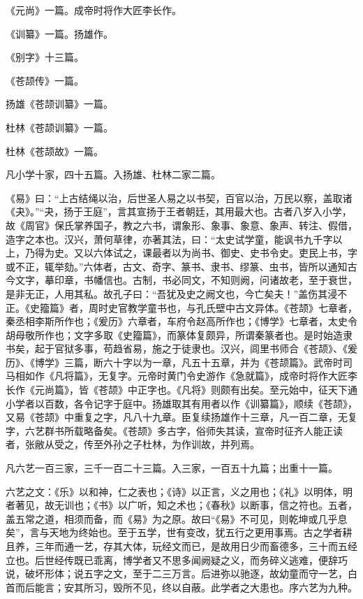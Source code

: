 \documentclass[]{article}
\begin{document}
《元尚》一篇。成帝时将作大匠李长作。

《训纂》一篇。扬雄作。

《别字》十三篇。

《苍颉传》一篇。

扬雄《苍颉训纂》一篇。

杜林《苍颉训纂》一篇。

杜林《苍颉故》一篇。

凡小学十家，四十五篇。入扬雄、杜林二家二篇。

《易》曰：``上古结绳以治，后世圣人易之以书契，百官以治，万民以察，盖取诸《夬》。''``夬，扬于王庭''，言其宣扬于王者朝廷，其用最大也。古者八岁入小学，故《周官》保氏掌养国子，教之六书，谓象形、象事、象意、象声、转注、假借，造字之本也。汉兴，萧何草律，亦著其法，曰：``太史试学童，能讽书九千字以上，乃得为史。又以六体试之，课最者以为尚书、御史、史书令史。吏民上书，字或不正，辄举劾。''六体者，古文、奇字、篆书、隶书、缪篆、虫书，皆所以通知古今文字，摹印章，书幡信也。古制，书必同文，不知则阙，问诸故老，至于衰世，是非无正，人用其私。故孔子曰：``吾犹及史之阙文也，今亡矣夫！''盖伤其浸不正。《史籀篇》者，周时史官教学童书也，与孔氏壁中古文异体。《苍颉》七章者，秦丞相李斯所作也；《爰历》六章者，车府令赵高所作也；《博学》七章者，太史令胡母敬所作也；文字多取《史籀篇》，而篆体复颇异，所谓秦篆者也。是时始造隶书矣，起于官狱多事，苟趋省易，施之于徒隶也。汉兴，闾里书师合《苍颉》、《爰历》、《博学》三篇，断六十字以为一章，凡五十五章，并为《苍颉篇》。武帝时司马相如作《凡将篇》，无复字。元帝时黄门令史游作《急就篇》，成帝时将作大匠李长作《元尚篇》，皆《苍颉》中正字也。《凡将》则颇有出矣。至元始中，征天下通小学者以百数，各令记字于庭中。扬雄取其有用者以作《训纂篇》，顺续《苍颉》，又易《苍颉》中重复之字，凡八十九章。臣复续扬雄作十三章，凡一百二章，无复字，六艺群书所载略备矣。《苍颉》多古字，俗师失其读，宣帝时征齐人能正读者，张敝从受之，传至外孙之子杜林，为作训故，并列焉。

凡六艺一百三家，三千一百二十三篇。入三家，一百五十九篇；出重十一篇。

六艺之文：《乐》以和神，仁之表也；《诗》以正言，义之用也；《礼》以明体，明者著见，故无训也；《书》以广听，知之术也；《春秋》以断事，信之符也。五者，盖五常之道，相须而备，而《易》为之原。故曰``《易》不可见，则乾坤或几乎息矣''，言与天地为终始也。至于五学，世有变改，犹五行之更用事焉。古之学者耕且养，三年而通一艺，存其大体，玩经文而已，是故用日少而畜德多，三十而五经立也。后世经传既已乖离，博学者又不思多闻阙疑之义，而务碎义逃难，便辞巧说，破坏形体；说五字之文，至于二三万言。后进弥以驰逐，故幼童而守一艺，白首而后能言；安其所习，毁所不见，终以自蔽。此学者之大患也。序六艺为九种。
\end{document}
